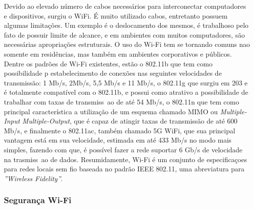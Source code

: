 \documentclass[journal]{IEEEtran}
\begin{document}
Devido ao elevado número de cabos necessários para interconectar computadores e dispositivos, surgiu o WiFi. É muito utilizado cabos, entretanto possuem algumas limitações. Um exemplo é o deslocamento dos mesmos, é trabalhoso pelo fato de possuir limite de alcance, e em ambientes com muitos computadores, são necessárias apropriações estruturais. O uso do Wi-Fi tem se tornando comuns nao somente em residências, mas também em ambientes corporativos e públicos. Dentre os padrões de Wi-Fi existentes, estão o 802.11b que tem como possibilidade p estabelecimento de conexões nas seguintes velocidades de transmissão: 1 Mb/s, 2Mb/s, 5,5 Mb/s e 11 Mb/s, o 802.11g que surgiu em 203 e é totalmente compatível com o 802.11b, e possui como atrativo a possibilidade de trabalhar com taxas de transmiss~ao de até 54 Mb/s, o 802.11n que tem como principal característica a utilização de um esquema chamado MIMO ou \emph{Multiple-Input Multiple-Output}, que é capaz de atingir taxas de transmissão de até 600 Mb/s, e finalmente o 802.11ac, também chamado 5G WiFi, que sua principal vantagem está em sua velocidade, estimada em até 433 Mb/s no modo mais simples, fazendo com que, é possível fazer a rede suportar 6 Gb/s  de velocidade na trasmiss~ao de dados. Resumidamente, Wi-Fi é um conjunto de especificaçoes para redes locais sem fio baseada no padrão IEEE 802.11, uma abreviatura para \emph{''Wireless Fidelity''}. \cite{wifiinfowester}

\subsubsection{Segurança Wi-Fi}
\end{document}
